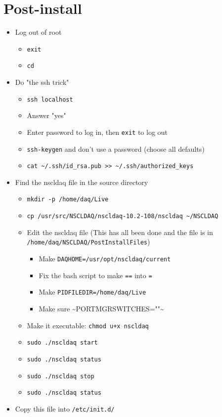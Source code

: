 \documentclass[11pt]{article}
\begin{document}
\section*{Post-install}
\label{sec-6}
\begin{itemize}
\item Log out of root
\begin{itemize}
\item \verb~exit~
\item \verb~cd~
\end{itemize}
\item Do "the ssh trick"
\begin{itemize}
\item \verb~ssh localhost~
\item Answer "yes"
\item Enter password to log in, then \verb~exit~ to log out
\item \verb~ssh-keygen~ and don't use a password (choose all defaults)
\item \verb,cat ~/.ssh/id_rsa.pub >> ~/.ssh/authorized_keys,
\end{itemize}
\item Find the nscldaq file in the source directory
\begin{itemize}
\item \verb~mkdir -p /home/daq/Live~
\item \verb,cp /usr/src/NSCLDAQ/nscldaq-10.2-108/nscldaq ~/NSCLDAQ,
\item Edit the nscldaq file (This has all been done and the file is in
      \verb~/home/daq/NSCLDAQ/PostInstallFiles~)
\begin{itemize}
\item Make \verb~DAQHOME=/usr/opt/nscldaq/current~
\item Fix the bash script to make \verb~==~ into \verb~=~
\item Make \verb~PIDFILEDIR=/home/daq/Live~
\item Make sure \textasciitilde{}PORTMGRSWITCHES=""\textasciitilde{}
\end{itemize}
\item Make it executable: \verb~chmod u+x nscldaq~
\item \verb~sudo ./nscldaq start~
\item \verb~sudo ./nscldaq status~
\item \verb~sudo ./nscldaq stop~
\item \verb~sudo ./nscldaq status~
\end{itemize}
\item Copy this file into \verb~/etc/init.d/~

\end{itemize}
\end{document}
